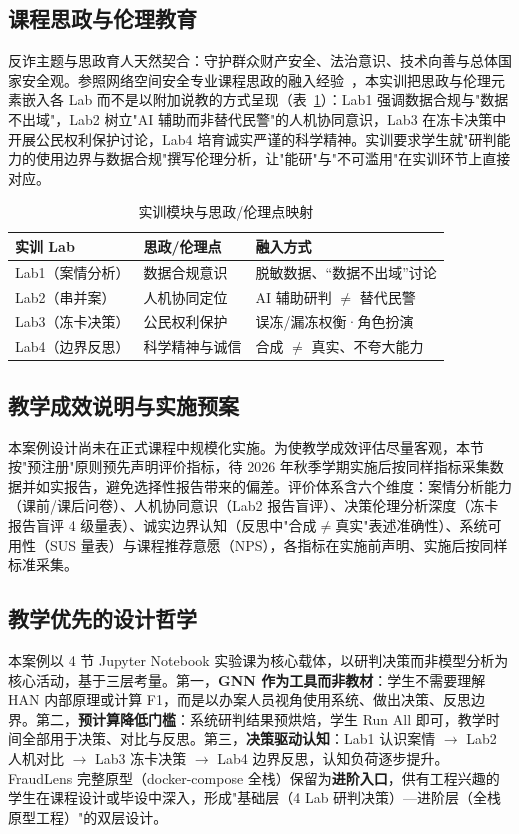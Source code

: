 \documentclass[12pt,a4paper]{ctexart}
\begin{document}
\subsection{课程思政与伦理教育}

反诈主题与思政育人天然契合：守护群众财产安全、法治意识、技术向善与总体国家安全观。参照网络空间安全专业课程思政的融入经验~\cite{edu_lijian2024}，本实训把思政与伦理元素嵌入各 Lab 而不是以附加说教的方式呈现（表~\ref{tab:sz}）：Lab1 强调数据合规与"数据不出域"，Lab2 树立"AI 辅助而非替代民警"的人机协同意识，Lab3 在冻卡决策中开展公民权利保护讨论，Lab4 培育诚实严谨的科学精神。实训要求学生就"研判能力的使用边界与数据合规"撰写伦理分析，让"能研"与"不可滥用"在实训环节上直接对应。

\begin{table}[htbp]
  \centering
  \caption{实训模块与思政/伦理点映射}
  \label{tab:sz}
  \begin{tabular}{lll}
    \toprule
    实训 Lab & 思政/伦理点 & 融入方式 \\
    \midrule
    Lab1（案情分析） & 数据合规意识 & 脱敏数据、“数据不出域”讨论 \\
    Lab2（串并案） & 人机协同定位 & AI 辅助研判 $\neq$ 替代民警 \\
    Lab3（冻卡决策） & 公民权利保护 & 误冻/漏冻权衡·角色扮演 \\
    Lab4（边界反思） & 科学精神与诚信 & 合成 $\neq$ 真实、不夸大能力 \\
    \bottomrule
  \end{tabular}
\end{table}

\subsection{教学成效说明与实施预案}

本案例设计尚未在正式课程中规模化实施。为使教学成效评估尽量客观，本节按"预注册"原则预先声明评价指标，待 2026 年秋季学期实施后按同样指标采集数据并如实报告，避免选择性报告带来的偏差。评价体系含六个维度：案情分析能力（课前/课后问卷）、人机协同意识（Lab2 报告盲评）、决策伦理分析深度（冻卡报告盲评 4 级量表）、诚实边界认知（反思中"合成$\neq$真实"表述准确性）、系统可用性（SUS 量表）与课程推荐意愿（NPS），各指标在实施前声明、实施后按同样标准采集。

\subsection{教学优先的设计哲学}

本案例以 4 节 Jupyter Notebook 实验课为核心载体，以研判决策而非模型分析为核心活动，基于三层考量。第一，\textbf{GNN 作为工具而非教材}：学生不需要理解 HAN 内部原理或计算 F1，而是以办案人员视角使用系统、做出决策、反思边界。第二，\textbf{预计算降低门槛}：系统研判结果预烘焙，学生 Run All 即可，教学时间全部用于决策、对比与反思。第三，\textbf{决策驱动认知}：Lab1 认识案情 $\to$ Lab2 人机对比 $\to$ Lab3 冻卡决策 $\to$ Lab4 边界反思，认知负荷逐步提升。FraudLens 完整原型（docker-compose 全栈）保留为\textbf{进阶入口}，供有工程兴趣的学生在课程设计或毕设中深入，形成"基础层（4 Lab 研判决策）—进阶层（全栈原型工程）"的双层设计。
\end{document}
